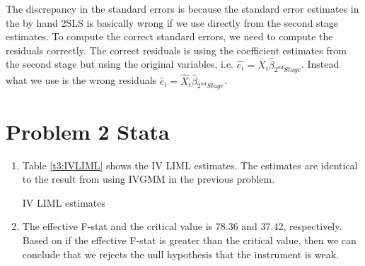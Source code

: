 \documentclass{article}
\newcommand{\bib}{references.bib}
\begin{document}
\begin{enumerate}
The discrepancy in the standard errors is because the standard error estimates in the by hand 2SLS is basically wrong if we use directly from the second stage estimates. To compute the correct standard errors, we need to compute the residuals correctly. The correct residuals is using the coefficient estimates from the second stage but using the original variables, i.e. $\hat{e_i}=X_i\hat{\beta}_{2^{nd} Stage}$. Instead what we use is the wrong residuals $\tilde{e_i}=\hat{X}_i\hat{\beta}_{2^{nd} Stage}$.
\end{enumerate}

\section*{Problem 2 Stata}
\begin{enumerate}
\item Table \ref{t3:IVLIML} shows the IV LIML estimates. The estimates are identical to the result from using IVGMM in the previous problem.
\begin{table}[H]\centering
\caption{IV LIML estimates}
\label{t3:IVLIML}
\begin{threeparttable}

\end{threeparttable}
\end{table}
\item The effective F-stat and the critical value is 78.36 and 37.42, respectively. Based on \cite{pflueger2015robust} if the effective F-stat is greater than the critical value, then we can conclude that we rejects the null hypothesis that the instrument is weak.
\end{enumerate}
    

\end{document}
